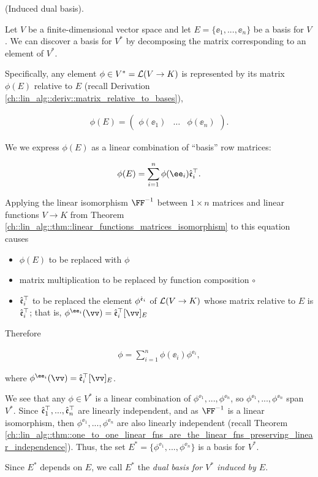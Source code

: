 \begin{deriv}
\label{ch::motivated_intro::deriv::induced_dual_basis}
    (Induced dual basis).
    
    Let $V$ be a finite-dimensional vector space and let $E = \{\ee_1, ..., \ee_n\}$ be a basis for $V$. We can discover a basis for $V^*$ by decomposing the matrix corresponding to an element of $V^*$.
    
    Specifically, any element ${\phi \in V^* = \mathcal{L}(V \rightarrow K)}$ is represented by its matrix $\phi(E)$ relative to $E$ (recall Derivation \ref{ch::lin_alg::deriv::matrix_relative_to_bases}),
    
    \begin{align*}
        \phi(E)
        =
        \begin{pmatrix} 
            \phi(\ee_1) & \hdots & \phi(\ee_n)
        \end{pmatrix}.
    \end{align*}
    
    We we express $\phi(E)$ as a linear combination of ``basis'' row matrices:
    
    \begin{align*}
        \phi(E) = \sum_{i = 1}^n \phi(\ee_i) \see_i^\top.
    \end{align*}
    
    Applying the linear isomorphism $\FF^{-1}$ between $1 \times n$ matrices and linear functions $V \rightarrow K$ from Theorem \ref{ch::lin_alg::thm::linear_functions_matrices_isomorphism} to this equation causes  \begin{itemize}
        \item $\phi(E)$ to be replaced with $\phi$
        \item matrix multiplication to be replaced by function composition $\circ$
        \item $\hat{\mathfrak{e}}_i^\top$ to be replaced the element $\phi^{\hat{\mathfrak{e}}_i}$ of $\mathcal{L}(V \rightarrow K)$ whose matrix relative to $E$ is $\hat{\mathfrak{e}}_i^\top$; that is, $\phi^{\ee_i}(\vv) = \see_i^\top [\vv]_E$
    \end{itemize}

    Therefore
    
    \begin{align*}
        \phi = \sum_{i = 1}^n \phi(\ee_i) \phi^{\ee_i},
    \end{align*}

    where $\phi^{\ee_i}(\vv) = \see_i^\top [\vv]_E$.
    
    We see that any $\phi \in V^*$ is a linear combination of $\phi^{\ee_1}, ..., \phi^{\ee_n}$, so $\phi^{\ee_1}, ..., \phi^{\ee_n}$ span $V^*$. Since $\hat{\mathfrak{e}}_1^\top, ..., \hat{\mathfrak{e}}_n^\top$ are linearly independent, and as $\FF^{-1}$ is a linear isomorphism, then $\phi^{\ee_1}, ..., \phi^{\ee_n}$ are also linearly independent (recall Theorem \ref{ch::lin_alg::thm::one_to_one_linear_fns_are_the_linear_fns_preserving_linear_independence}). Thus, the set ${E^* = \{\phi^{\ee_1}, ..., \phi^{\ee_n}\}}$ is a basis for $V^*$.
    
    Since $E^*$ depends on $E$, we call $E^*$ the \textit{dual basis for $V^*$ induced by $E$}.
\end{deriv}

